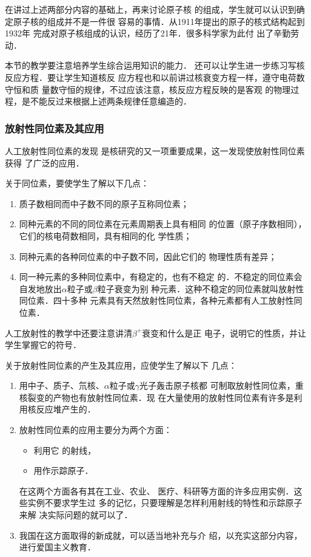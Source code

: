 在讲过上述两部分内容的基础上，再来讨论原子核
的组成，学生就可以认识到确定原子核的组成并不是一件很
容易的事情．从1911年提出的原子的核式结构起到1932年
完成对原子核组成的认识，经历了21年．很多科学家为此付
出了辛勤劳动．

本节的教学要注意培养学生综合运用知识的能力．
还可以让学生进一步练习写核反应方程．要让学生知道核反
应方程也和以前讲过核衰变方程一样，遵守电荷数守恒和质
量数守恒的规律，不过应该注意，核反应方程反映的是客观
的物理过程，是不能反过来根据上述两条规律任意编造的．

\subsubsection{放射性同位素及其应用}

人工放射性同位素的发现
是核研究的又一项重要成果，这一发现使放射性同位素获得
了广泛的应用．

关于同位素，要使学生了解以下几点：
\begin{enumerate}
\item 质子数相同而中子数不同的原子互称同位素；
\item 同种元素的不同的同位素在元素周期表上具有相同
的位置（原子序数相同），它们的核电荷数相同，具有相同的化
学性质；
\item 同种元素的各种同位素的中子数不同，因此它们的
物理性质有差异；
\item 同一种元素的多种同位素中，有稳定的，也有不稳定
的．不稳定的同位素会自发地放出$\alpha$粒子或$\beta$粒子衰变为别
种元素．这种不稳定的同位素就叫放射性同位素．四十多种
元素具有天然放射性同位素，各种元素都有人工放射性同
位素．
\end{enumerate}

人工放射性的教学中还要注意讲清$\beta^+$衰变和什么是正
电子，说明它的性质，并让学生掌握它的符号．

关于放射性同位素的产生及其应用，应使学生了解以下
几点：
\begin{enumerate}
\item 用中子、质子、氘核、$\alpha$粒子或$\gamma$光子轰击原子核都
可制取放射性同位素，重核裂变的产物也有放射性同位素．现
在大量使用的放射性同位素有许多是利用核反应堆产生的．

\item 放射性同位素的应用主要分为两个方面：
\begin{itemize}
\item 利用它
的射线，    \item 用作示踪原子．
\end{itemize}
在这两个方面各有其在工业、农业、
医疗、科研等方面的许多应用实例．这些实例不要求学生过
多的记忆，只要理解是怎样利用射线的特性和示踪原子来解
决实际问题的就可以了．
\item 
我国在这方面取得的新成就，可以适当地补充与介
绍，以充实这部分内容，进行爱国主义教育．
\end{enumerate}


